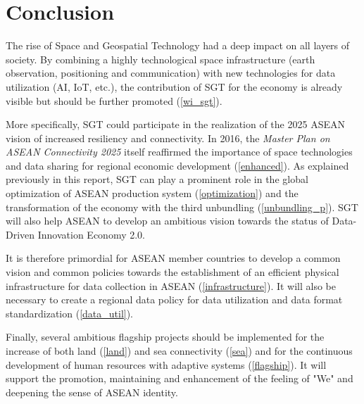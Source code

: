 \chapter*{Conclusion}

\tab The rise of Space and Geospatial Technology had a deep impact on all layers of society. By combining a highly technological space infrastructure (earth observation, positioning and communication) with new technologies for data utilization (AI, IoT, etc.), the contribution of SGT for the economy is already visible but should be further promoted (\ref{wi_sgt}). 

\vspace{0.4 cm}

More specifically, SGT could participate in the realization of the 2025 ASEAN vision of increased resiliency and connectivity. In 2016, the \textit{Master Plan on ASEAN Connectivity 2025} itself reaffirmed the importance of space technologies and data sharing for regional economic development (\ref{enhanced}). As explained previously in this report, SGT can play a prominent role in the global optimization of ASEAN production system (\ref{optimization}) and the transformation of the economy with the third unbundling (\ref{unbundling_p}). SGT will also help ASEAN to develop an ambitious vision towards the status of Data-Driven Innovation Economy 2.0.

\vspace{0.4 cm}

It is therefore primordial for ASEAN member countries to develop a common vision and common policies towards the establishment of an efficient physical infrastructure for data collection in ASEAN (\ref{infrastructure}). It will also be necessary to create a regional data policy for data utilization and data format standardization (\ref{data_util}).

\vspace{0.4 cm}

Finally, several ambitious flagship projects should be implemented for the increase of both land (\ref{land}) and sea connectivity (\ref{sea}) and for the continuous development of human resources with adaptive systems (\ref{flagship}). It will support the promotion, maintaining and enhancement of the feeling of "We" and deepening the sense of ASEAN identity.




